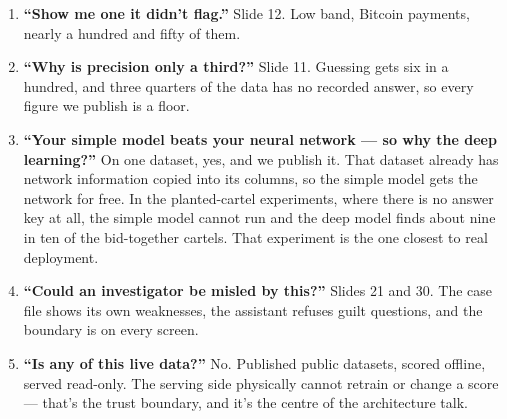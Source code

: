 \documentclass[11pt]{article}
\begin{document}

\begin{enumerate}
  \item \textbf{``Show me one it didn't flag.''} Slide 12. Low band, Bitcoin
        payments, nearly a hundred and fifty of them.
  \item \textbf{``Why is precision only a third?''} Slide 11. Guessing gets six
        in a hundred, and three quarters of the data has no recorded answer, so
        every figure we publish is a floor.
  \item \textbf{``Your simple model beats your neural network --- so why the
        deep learning?''} On one dataset, yes, and we publish it. That dataset
        already has network information copied into its columns, so the simple
        model gets the network for free. In the planted-cartel experiments,
        where there is no answer key at all, the simple model cannot run and
        the deep model finds about nine in ten of the bid-together cartels.
        That experiment is the one closest to real deployment.
  \item \textbf{``Could an investigator be misled by this?''} Slides 21 and 30.
        The case file shows its own weaknesses, the assistant refuses guilt
        questions, and the boundary is on every screen.
  \item \textbf{``Is any of this live data?''} No. Published public datasets,
        scored offline, served read-only. The serving side physically cannot
        retrain or change a score --- that's the trust boundary, and it's the
        centre of the architecture talk.
\end{enumerate}
\end{document}
